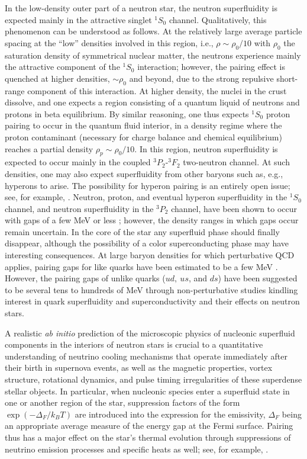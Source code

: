 \documentclass[rmp,preprint,aps,floatfix]{revtex4}
\begin{document}
In the low-density outer part of a neutron star, 
the neutron superfluidity is expected 
mainly in the attractive singlet $^1S_0$ channel. 
Qualitatively, this phenomenon can be understood
as follows.  At the relatively large average particle spacing at the 
``low'' densities involved in this region, i.e., $\rho \sim \rho_0/10$ 
with  $\rho_0$ the saturation density 
of symmetrical nuclear matter, 
the neutrons experience mainly the attractive component 
of the $^1S_0$ interaction;  however, the pairing effect is quenched 
at higher densities, $\sim \rho_0$ and beyond, due to the strong 
repulsive short-range component of this interaction.  
At higher density, the nuclei in the crust dissolve, and one 
expects a region consisting of a quantum liquid of neutrons and 
protons in beta equilibrium. 
By similar reasoning, one 
thus expects $^1S_0$ proton pairing to occur in the quantum fluid interior, 
in a density regime where the proton contaminant (necessary for
charge balance and chemical equilibrium) reaches a partial 
density $\rho_p \sim \rho_0/10$. 
In this region, neutron superfluidity is expected to  
occur mainly in the coupled $^3P_2$-$^3F_2$ two-neutron channel. 
At such densities, one may also expect superfluidity from 
other baryons such as, e.g., 
hyperons to arise. The possibility for hyperon pairing is an entirely open
issue; see, for example, \cite{barnea1996}.
Neutron, proton, and eventual hyperon superfluidity in the $^1S_0$
channel, and neutron  superfluidity in the $^3P_2$ channel, have been shown
to occur with gaps of a few MeV or less \cite{pair2};
however, the density ranges in which gaps occur remain
uncertain. 
In the core of the star any superfluid 
phase should finally disappear, although the possibility of a
color superconducting phase may have interesting consequences.
At large baryon densities for which perturbative QCD
applies, pairing gaps for like quarks have been estimated to be a few
MeV \cite{bailin84}.  However, the pairing gaps of unlike quarks ($ud,~
us$, and $ds$) have been suggested to be several tens to
hundreds of MeV through non-perturbative studies \cite{qsf0}
kindling interest in quark superfluidity and superconductivity
\cite{qsf} and their effects on
neutron stars.

A realistic {\it ab initio} prediction of the 
microscopic physics of nucleonic superfluid components in the interiors 
of neutron stars is crucial to a quantitative understanding of neutrino 
cooling mechanisms \cite{cooling1,cooling2,cooling3,nstar} 
that operate immediately after their birth 
in supernova events, as well as the magnetic properties, vortex structure, 
rotational dynamics, and pulse timing irregularities of these 
superdense stellar objects.  
In particular, when nucleonic species enter 
a superfluid state in one or another region of the star, suppression 
factors of the form $\exp (-\Delta_F /k_B T)$ are introduced 
into the expression for the emissivity, $\Delta_F$ being an appropriate 
average measure of the energy gap at the Fermi surface.  
Pairing thus has a major effect on the
star's thermal evolution through suppressions of neutrino
emission processes and specific heats as well; see, for example,
\cite{page2000}.  
\end{document}
